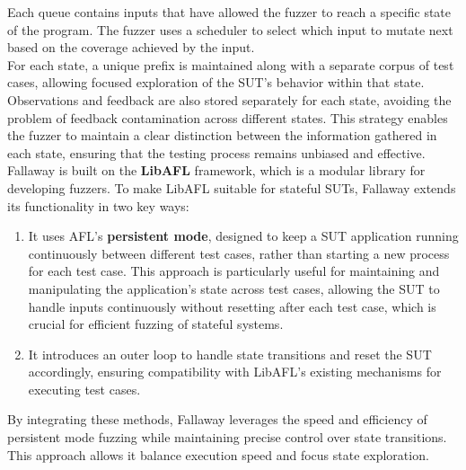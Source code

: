 Each queue contains inputs that have allowed the fuzzer to reach a specific state of the program. The fuzzer uses a scheduler to select which input to mutate next based on the coverage achieved by the input.
\\For each state, a unique prefix is maintained along with a separate corpus of test cases, allowing focused exploration of the SUT's behavior within that state. Observations and feedback are also stored separately for each state, avoiding the problem of feedback contamination across different states. This strategy enables the fuzzer to maintain a clear distinction between the information gathered in each state, ensuring that the testing process remains unbiased and effective.
\\Fallaway is built on the \textbf{LibAFL} \cite{libafl} framework, which is a modular library for developing fuzzers. To make LibAFL suitable for stateful SUTs, Fallaway extends its functionality in two key ways:
\begin{enumerate}
    \item It uses AFL's \textbf{persistent mode}, designed to keep a SUT application running continuously between different test cases, rather than starting a new process for each test case. This approach is particularly useful for maintaining and manipulating the application's state across test cases, allowing the SUT to handle inputs continuously without resetting after each test case, which is crucial for efficient fuzzing of stateful systems.
    \item It introduces an outer loop to handle state transitions and reset the SUT accordingly, ensuring compatibility with LibAFL's existing mechanisms for executing test cases.
\end{enumerate}  
By integrating these methods, Fallaway leverages the speed and efficiency of persistent mode fuzzing while maintaining precise control over state transitions. This approach allows it balance execution speed and focus state exploration.
